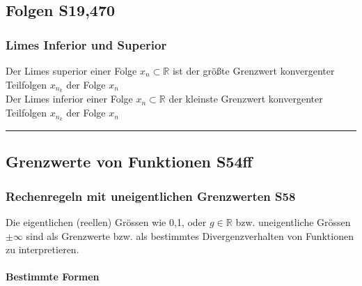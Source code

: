 	\subsection{Folgen \color{red} S19,470}

		

		
		
		\subsubsection{Limes Inferior und Superior}
		Der Limes superior einer Folge $x_n \subset \mathbb{R}$ ist der größte Grenzwert konvergenter Teilfolgen $x_{n_k}$ der Folge ${x_n}$ \\
		Der Limes inferior einer Folge $x_n \subset \mathbb{R}$ der kleinste Grenzwert konvergenter Teilfolgen $x_{n_k}$ der Folge $x_n$
		\hrule
		\subsection{Grenzwerte von Funktionen \color{red} S54ff}
		\subsubsection{Rechenregeln mit uneigentlichen Grenzwerten \color{red}S58}
		Die eigentlichen (reellen) Grössen wie 0,1, oder $g\in \mathbb R$ bzw. uneigentliche Grössen $\pm\infty$ sind als Grenzwerte bzw. als bestimmtes Divergenzverhalten von Funktionen zu interpretieren.\	
		
		\paragraph{Bestimmte Formen}\
		
